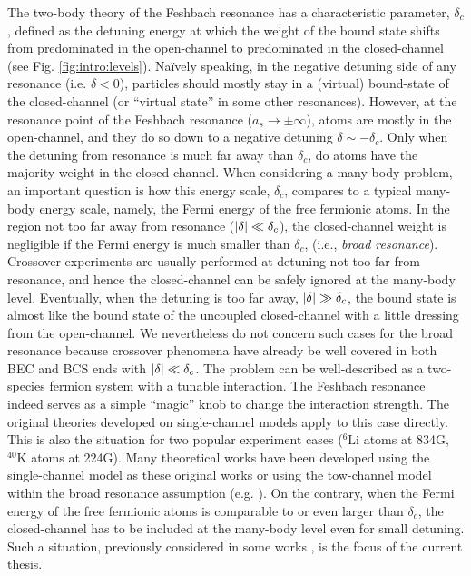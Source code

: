   The two-body theory of the Feshbach resonance has a characteristic  parameter, $\delta_c$, defined as  the detuning energy at which the weight of the bound state shifts from predominated in the open-channel to predominated in the closed-channel (see Fig. \ref{fig:intro:levels}).  Na\"{i}vely speaking, in the negative detuning side of any resonance (i.e. $\delta<0$), particles should mostly stay  in a (virtual) bound-state of the closed-channel (or ``virtual state'' in some other resonances).  However, at the resonance point  of the Feshbach resonance ($a_s\to\pm\infty$), atoms are mostly in the open-channel, and they do so down to a negative detuning $\delta\sim-\delta_c$. Only when the detuning from resonance is much far away than $\delta_c$, do atoms have the majority weight in the closed-channel.    When considering a many-body problem, an important question is how this energy scale, $\delta_c$, compares to a typical many-body energy scale, namely, the Fermi energy of the free fermionic atoms. In the region not too far away from resonance ($\left\lvert{\delta}\right\rvert\ll\delta_{c}$), the closed-channel weight is negligible if the Fermi energy is much smaller than $\delta_c$, (i.e., \emph{broad resonance}).  Crossover experiments are usually performed at detuning not too far from resonance, and hence the closed-channel can be safely ignored at the many-body level. Eventually, when the detuning is too far away, $\left\lvert{\delta}\right\rvert\gg\delta_{c}$, the bound state is almost like the bound state of the  uncoupled closed-channel with a little dressing from the open-channel.  We nevertheless do not concern such cases for the broad resonance because crossover phenomena have already be well covered in both BEC and BCS ends with $\left\lvert{\delta}\right\rvert\ll\delta_{c}$. The problem can be well-described as a two-species fermion system with a tunable interaction.  The Feshbach resonance indeed serves as a simple ``magic'' knob to change the interaction strength.  The original  theories developed on  single-channel models  apply to this case directly.  This is also the situation for two  popular experiment cases (${}^{6}\text{Li}$ atoms at 834G, $^{40}\text{K}$ atoms at 224G).   Many theoretical works have been developed using the single-channel model as these original works or using the tow-channel model within the broad resonance assumption (e.g. \cite{Holland01,HoUniversal,Fuchs04}). On the contrary, when the Fermi energy of the free fermionic atoms is  comparable to or even larger than $\delta_c$, the closed-channel has to be included at the many-body level even for small detuning. Such a situation, previously considered in some works \cite{GurarieNarrow}, is the focus of the current thesis. 
  
